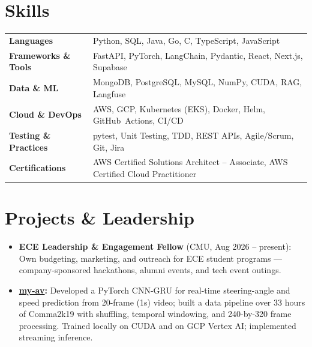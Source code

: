 \documentclass[11pt, letterpaper]{article}
\begin{document}
\section{Skills}
\begin{tabularx}{\textwidth}{@{}l @{\hspace{7pt}} >{\raggedright\arraybackslash}X@{}}
  \textbf{Languages} & Python, SQL, Java, Go, C, TypeScript, JavaScript \\[1pt]
  \textbf{Frameworks \& Tools} & FastAPI, PyTorch, LangChain, Pydantic, React, Next.js, Supabase \\[1pt]
  \textbf{Data \& ML} & MongoDB, PostgreSQL, MySQL, NumPy, CUDA, RAG, Langfuse \\[1pt]
  \textbf{Cloud \& DevOps} & AWS, GCP, Kubernetes (EKS), Docker, Helm, GitHub~Actions, CI/CD \\[1pt]
  \textbf{Testing \& Practices} & pytest, Unit Testing, TDD, REST APIs, Agile/Scrum, Git, Jira \\[1pt]
  \textbf{Certifications} & AWS Certified Solutions Architect -- Associate, AWS Certified Cloud Practitioner \\
\end{tabularx}

\section{Projects \& Leadership}
\begin{itemize}
  \item \textbf{ECE Leadership \& Engagement Fellow} (CMU, Aug 2026 -- present): Own budgeting, marketing, and outreach for ECE student programs --- company-sponsored hackathons, alumni events, and tech event outings.
  \item \textbf{\href{https://github.com/lordphone/my-av}{my-av}:} Developed a PyTorch CNN-GRU for real-time steering-angle and speed prediction from 20-frame (1s) video; built a data pipeline over 33 hours of Comma2k19 with shuffling, temporal windowing, and 240-by-320 frame processing. Trained locally on CUDA and on GCP Vertex AI; implemented streaming inference.
\end{itemize}
\end{document}
